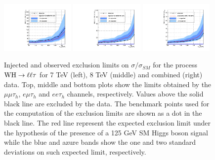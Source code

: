 \begin{figure}
\begin{center}
  \includegraphics[width=0.32\textwidth]{4_Analisys/pics/limits/eet/eet_injected_7TeV.pdf}
  \includegraphics[width=0.32\textwidth]{4_Analisys/pics/limits/eet/eet_injected_8TeV.pdf}
  \includegraphics[width=0.32\textwidth]{4_Analisys/pics/limits/eet/eet_injected.pdf} \\
  \caption{Injected and observed exclusion limits on $\sigma/\sigma_{SM}$ for the process $\mathrm{W}\mathrm{H} \rightarrow \ell \ell \tau$ for 7 TeV (left), 8 TeV (middle) and combined (right) data. Top, middle and bottom plots show the limits obtained by the $\mu\mu\tau_h$, $e\mu\tau_h$ and $ee\tau_h$ channels, respectively. Values above the solid black line are excluded by the data. The benchmark points used for the computation of the exclusion limits are shown as a dot in the black line. The red line represent the expected exclusion limit under the hypothesis of the presence of a 125 GeV SM Higgs boson signal while the blue and azure bands show the one and two standard deviations on such expected limit, respectively.}
  \label{fig:llt_chan_injected}
\end{center}
\end{figure}


